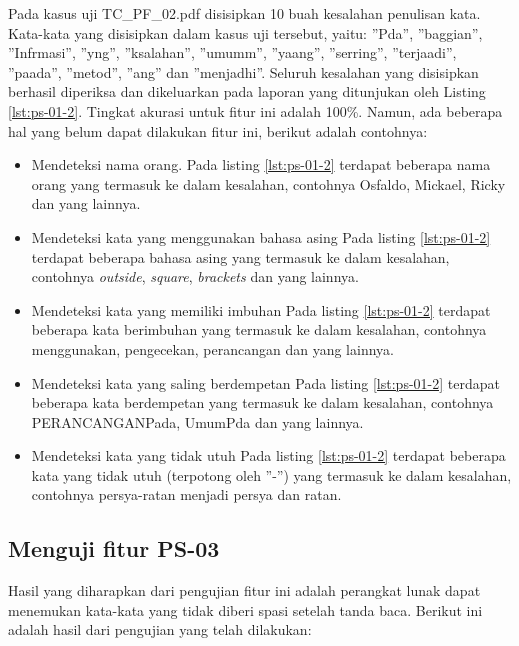 Pada kasus uji TC\_PF\_02.pdf disisipkan 10 buah kesalahan penulisan kata. Kata-kata yang disisipkan dalam kasus uji tersebut, yaitu: ''Pda'', ''baggian'', ''Infrmasi'', ''yng'', ''ksalahan'', ''umumm'', ''yaang'', ''serring'', ''terjaadi'', ''paada'', ''metod'', ''ang'' dan ''menjadhi''. Seluruh kesalahan yang disisipkan berhasil diperiksa dan dikeluarkan pada laporan yang ditunjukan oleh Listing \ref{lst:ps-01-2}. Tingkat akurasi untuk fitur ini adalah 100\%. Namun, ada beberapa hal yang belum dapat dilakukan fitur ini, berikut adalah contohnya:

\begin{itemize}
	\item Mendeteksi nama orang. \newline
	Pada listing \ref{lst:ps-01-2} terdapat beberapa nama orang yang termasuk ke dalam kesalahan, contohnya Osfaldo, Mickael, Ricky dan yang lainnya.
	
	\item Mendeteksi kata yang menggunakan bahasa asing \newline
	Pada listing \ref{lst:ps-01-2} terdapat beberapa bahasa asing yang termasuk ke dalam kesalahan, contohnya \textit{outside}, \textit{square}, \textit{brackets} dan yang lainnya.
	
	\item Mendeteksi kata yang memiliki imbuhan \newline
	Pada listing \ref{lst:ps-01-2} terdapat beberapa kata berimbuhan yang termasuk ke dalam kesalahan, contohnya menggunakan, pengecekan, perancangan dan yang lainnya.
	
	\item Mendeteksi kata yang saling berdempetan \newline
	Pada listing \ref{lst:ps-01-2} terdapat beberapa kata berdempetan yang termasuk ke dalam kesalahan, contohnya PERANCANGANPada, UmumPda dan yang lainnya.
	
	\item Mendeteksi kata yang tidak utuh \newline
	Pada listing \ref{lst:ps-01-2} terdapat beberapa kata yang tidak utuh (terpotong oleh ''-'') yang termasuk ke dalam kesalahan, contohnya persya-ratan menjadi persya dan ratan.
\end{itemize}

\subsection{Menguji fitur PS-03}
Hasil yang diharapkan dari pengujian fitur ini adalah perangkat lunak dapat menemukan kata-kata yang tidak diberi spasi setelah tanda baca. Berikut ini adalah hasil dari pengujian yang telah dilakukan:

